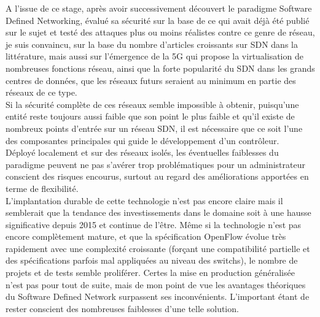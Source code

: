 A l'issue de ce stage, après avoir successivement découvert le paradigme Software Defined Networking, évalué sa sécurité sur la base de ce qui avait déjà été publié sur le sujet et testé des attaques plus ou moins réalistes contre ce genre de réseau, je suis convaincu, sur la base du nombre d'articles croissants sur SDN dans la littérature, mais aussi sur l'émergence de la 5G qui propose la virtualisation de nombreuses fonctions réseau, ainsi que la forte popularité du SDN dans les grands centres de données, que les réseaux futurs seraient au minimum en partie des réseaux de ce type.\\
 
Si la sécurité complète de ces réseaux semble impossible à obtenir, puisqu'une entité reste toujours aussi faible que son point le plus faible et qu'il existe de nombreux points d'entrée sur un réseau SDN, il est nécessaire que ce soit l'une des composantes principales qui guide le développement d'un contrôleur.\\
Déployé localement et sur des réseaux isolés, les éventuelles faiblesses du paradigme peuvent ne pas s'avérer trop problématiques pour un administrateur conscient des risques encourus, surtout au regard des améliorations apportées en terme de flexibilité.\\
L'implantation durable de cette technologie n'est pas encore claire mais il semblerait que la tendance des investissements dans le domaine soit à une hausse significative depuis 2015 et continue de l'être. Même si la technologie n'est pas encore complètement mature, et que la spécification OpenFlow évolue très rapidement avec une complexité croissante (forçant une compatibilité partielle et des spécifications parfois mal appliquées au niveau des switchs), le nombre de projets et de tests semble proliférer. Certes la mise en production généralisée n'est pas pour tout de suite, mais de mon point de vue les avantages théoriques du Software Defined Network surpassent ses inconvénients. L'important étant de rester conscient des nombreuses faiblesses d'une telle solution.\\

